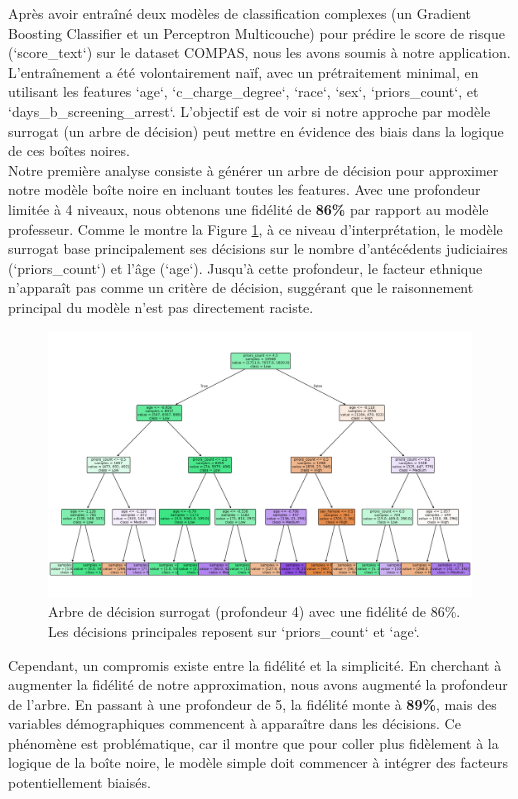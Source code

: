 \documentclass{article}
\begin{document}
\quad Après avoir entraîné deux modèles de classification complexes (un Gradient Boosting Classifier et un Perceptron Multicouche) pour prédire le score de risque (`score\_text`) sur le dataset COMPAS, nous les avons soumis à notre application. L'entraînement a été volontairement naïf, avec un prétraitement minimal, en utilisant les features `age`, `c\_charge\_degree`, `race`, `sex`, `priors\_count`, et `days\_b\_screening\_arrest`. L'objectif est de voir si notre approche par modèle surrogat (un arbre de décision) peut mettre en évidence des biais dans la logique de ces boîtes noires.\\

Notre première analyse consiste à générer un arbre de décision pour approximer notre modèle boîte noire en incluant toutes les features. Avec une profondeur limitée à 4 niveaux, nous obtenons une fidélité de \textbf{86\%} par rapport au modèle professeur. Comme le montre la Figure \ref{fig:tree_lvl4}, à ce niveau d'interprétation, le modèle surrogat base principalement ses décisions sur le nombre d'antécédents judiciaires (`priors\_count`) et l'âge (`age`). Jusqu'à cette profondeur, le facteur ethnique n'apparaît pas comme un critère de décision, suggérant que le raisonnement principal du modèle n'est pas directement raciste.

\begin{figure}[h!]
    \centering
    \includegraphics[width=\textwidth]{tree_with_lvl4.png}
    \caption{Arbre de décision surrogat (profondeur 4) avec une fidélité de 86\%. Les décisions principales reposent sur `priors\_count` et `age`.}
    \label{fig:tree_lvl4}
\end{figure}

\clearpage

\quad Cependant, un compromis existe entre la fidélité et la simplicité. En cherchant à augmenter la fidélité de notre approximation, nous avons augmenté la profondeur de l'arbre. En passant à une profondeur de 5, la fidélité monte à \textbf{89\%}, mais des variables démographiques commencent à apparaître dans les décisions. Ce phénomène est problématique, car il montre que pour coller plus fidèlement à la logique de la boîte noire, le modèle simple doit commencer à intégrer des facteurs potentiellement biaisés.\\
\end{document}
